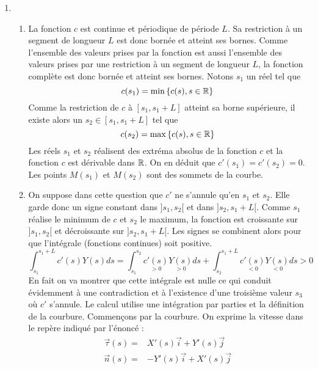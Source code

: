 \begin{enumerate}
\item 
\begin{enumerate}
 \item La fonction $c$ est continue et périodique de période $L$. Sa restriction à un segment de longueur $L$ est donc bornée et atteint ses bornes. Comme l'ensemble des valeurs prises par la fonction est aussi l'ensemble des valeurs prises par une restriction à un segment de longueur $L$, la fonction complète est donc bornée et atteint ses bornes.\newline
Notons $s_1$ un réel tel que
\begin{displaymath}
 c(s_1)=\min\left\lbrace c(s), s\in \mathbb{R}\right\rbrace 
\end{displaymath}
Comme la restriction de $c$ à $[s_1,s_1+L]$ atteint sa borne supérieure, il existe alors un $s_2\in[s_1,s_1+L]$ tel que
\begin{displaymath}
 c(s_2)=\max\left\lbrace c(s), s\in \mathbb{R}\right\rbrace 
\end{displaymath}
Les réels $s_1$ et $s_2$ réalisent des extréma absolus de la fonction $c$ et la fonction $c$ est dérivable dans $\mathbb{R}$. On en déduit que $c'(s_1)=c'(s_2)=0$. Les points $M(s_1)$ et $M(s_2)$ sont des sommets de la courbe.
\item On suppose dans cette question que $c'$ ne s'annule qu'en $s_1$ et $s_2$. Elle garde donc un signe constant dans $]s_1,s_2[$ et dans $]s_2,s_1+L[$. Comme $s_1$ réalise le minimum de $c$ et $s_2$ le maximum, la fonction est croissante sur $]s_1,s_2[$ et décroissante sur $]s_2,s_1+L[$. Les signes se combinent alors pour que l'intégrale (fonctions continues) soit positive.
\begin{displaymath}
 \int_{s_1}^{s_1+L}c'(s)Y(s)ds
= \int_{s_1}^{s_2}\underset{>0}{c'(s)}\underset{>0}{Y(s)}ds 
+ \int_{s_2}^{s_1+L}\underset{<0}{c'(s)}\underset{<0}{Y(s)}ds
> 0
\end{displaymath}
En fait on va montrer que cette intégrale est nulle ce qui conduit évidemment à une contradiction et à l'existence d'une troisième valeur $s_3$ où $c'$ s'annule.\newline
Le calcul utilise une intégration par parties et la définition de la courbure. Commençons par la courbure. On exprime la vitesse dans le repère indiqué par l'énoncé :
\begin{displaymath}\left. 
 \begin{aligned}
\overrightarrow \tau (s) =& X'(s)\overrightarrow i + Y'(s)\overrightarrow j \\ 
\overrightarrow n (s) =& -Y'(s)\overrightarrow i + X'(s)\overrightarrow j \\

\end{aligned}
\end{displaymath}
\end{enumerate}
\end{enumerate}
